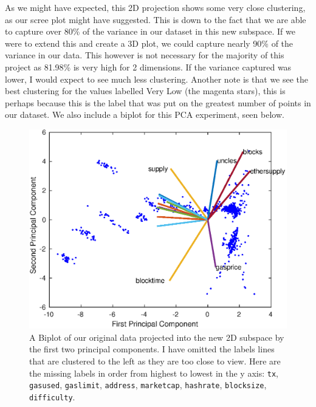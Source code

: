 \documentclass{article}
\begin{document}
As we might have expected, this 2D projection shows some very close clustering, as our scree plot might have suggested. This is down to the fact that we are able to capture over 80\% of the variance in our dataset in this new subspace. If we were to extend this and create a 3D plot, we could capture nearly 90\% of the variance in our data. This however is not necessary for the majority of this project as 81.98\% is very high for 2 dimensions. If the variance captured was lower, I would expect to see much less clustering. Another note is that we see the best clustering for the values labelled Very Low (the magenta stars), this is perhaps because this is the label that was put on the greatest number of points in our dataset. We also include a biplot for this PCA experiment, seen below.


\begin{figure}[H]
\centering
\caption{A Biplot of our original data projected into the new 2D subspace by the first two principal components. I have omitted the labels lines that are clustered to the left as they are too close to view. Here are the missing labels in order from highest to lowest in the y axis: \texttt{tx}, \texttt{gasused}, \texttt{gaslimit}, \texttt{address}, \texttt{marketcap}, \texttt{hashrate}, \texttt{blocksize}, \texttt{difficulty}.}
\includegraphics{main/eth_2d_biplot_better.eps}
\end{figure}
\end{document}
